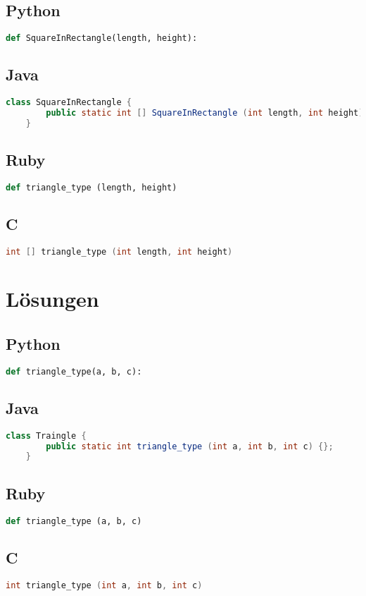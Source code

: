\documentclass[a4paper]{article}
\begin{document}
\subsection*{Python}
\begin{lstlisting}[language=Python]
	def SquareInRectangle(length, height):
\end{lstlisting}
\subsection*{Java}
\begin{lstlisting}[language=Java]
	class SquareInRectangle {
		public static int [] SquareInRectangle (int length, int height) {};
	}
\end{lstlisting}
\subsection*{Ruby}
\begin{lstlisting}[language=Ruby]
	def triangle_type (length, height)
\end{lstlisting}
\subsection*{C}
\begin{lstlisting}[language=C]
	int [] triangle_type (int length, int height)
\end{lstlisting}
\newpage
\onecolumn
\section*{Lösungen}
\subsection*{Python}
\begin{lstlisting}[language=Python]
	def triangle_type(a, b, c):
\end{lstlisting}
\subsection*{Java}
\begin{lstlisting}[language=Java]
	class Traingle {
		public static int triangle_type (int a, int b, int c) {};
	}
\end{lstlisting}
\subsection*{Ruby}
\begin{lstlisting}[language=Ruby]
	def triangle_type (a, b, c)
\end{lstlisting}
\subsection*{C}
\begin{lstlisting}[language=C]
	int triangle_type (int a, int b, int c)
\end{lstlisting}
\end{document}
